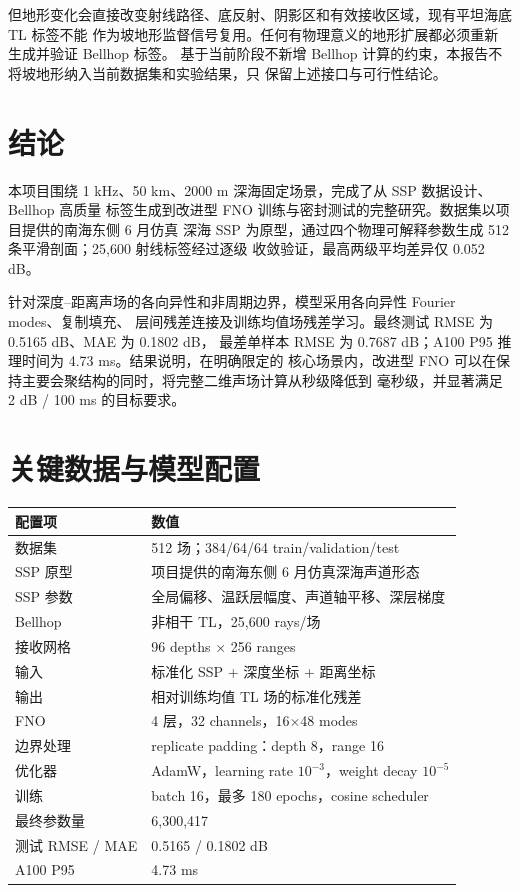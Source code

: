 \documentclass[UTF8,11pt]{ctexart}
\begin{document}
但地形变化会直接改变射线路径、底反射、阴影区和有效接收区域，现有平坦海底 TL 标签不能
作为坡地形监督信号复用。任何有物理意义的地形扩展都必须重新生成并验证 Bellhop 标签。
基于当前阶段不新增 Bellhop 计算的约束，本报告不将坡地形纳入当前数据集和实验结果，只
保留上述接口与可行性结论。

\section{结论}

本项目围绕 1 kHz、50 km、2000 m 深海固定场景，完成了从 SSP 数据设计、Bellhop 高质量
标签生成到改进型 FNO 训练与密封测试的完整研究。数据集以项目提供的南海东侧 6 月仿真
深海 SSP 为原型，通过四个物理可解释参数生成 512 条平滑剖面；25,600 射线标签经过逐级
收敛验证，最高两级平均差异仅 0.052 dB。

针对深度--距离声场的各向异性和非周期边界，模型采用各向异性 Fourier modes、复制填充、
层间残差连接及训练均值场残差学习。最终测试 RMSE 为 0.5165 dB、MAE 为 0.1802 dB，
最差单样本 RMSE 为 0.7687 dB；A100 P95 推理时间为 4.73 ms。结果说明，在明确限定的
核心场景内，改进型 FNO 可以在保持主要会聚结构的同时，将完整二维声场计算从秒级降低到
毫秒级，并显著满足 2 dB / 100 ms 的目标要求。

\appendix
\section{关键数据与模型配置}

\begin{longtable}{L{5.0cm}L{9.0cm}}
\toprule
配置项 & 数值 \\
\midrule
\endhead
数据集 & 512 场；384/64/64 train/validation/test \\
SSP 原型 & 项目提供的南海东侧 6 月仿真深海声道形态 \\
SSP 参数 & 全局偏移、温跃层幅度、声道轴平移、深层梯度 \\
Bellhop & 非相干 TL，25,600 rays/场 \\
接收网格 & 96 depths $\times$ 256 ranges \\
输入 & 标准化 SSP + 深度坐标 + 距离坐标 \\
输出 & 相对训练均值 TL 场的标准化残差 \\
FNO & 4 层，32 channels，16$\times$48 modes \\
边界处理 & replicate padding：depth 8，range 16 \\
优化器 & AdamW，learning rate $10^{-3}$，weight decay $10^{-5}$ \\
训练 & batch 16，最多 180 epochs，cosine scheduler \\
最终参数量 & 6,300,417 \\
测试 RMSE / MAE & 0.5165 / 0.1802 dB \\
A100 P95 & 4.73 ms \\
\bottomrule
\end{longtable}
\end{document}
